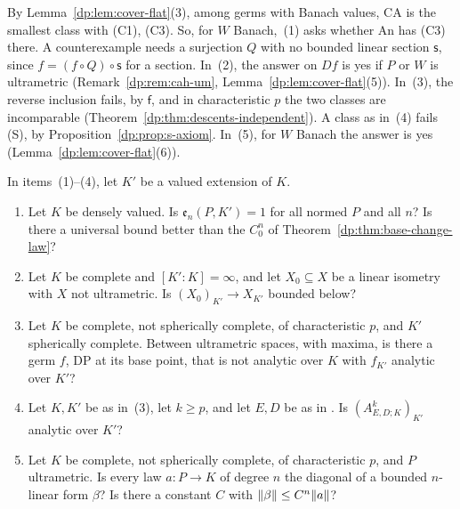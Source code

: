 By Lemma~\ref{dp:lem:cover-flat}(3), among germs with Banach values, CA is the smallest class with (C1), (C3). So, for $W$ Banach,~(1) asks whether An has (C3) there. A counterexample needs a surjection $Q$ with no bounded linear section $\mathsf s$, since $f=(f\circ Q)\circ\mathsf s$ for a section. In~(2), the answer on $Df$ is yes if $P$ or $W$ is ultrametric (Remark~\ref{dp:rem:cah-um}, Lemma~\ref{dp:lem:cover-flat}(5)). In~(3), the reverse inclusion fails, by $\mathsf f$, and in characteristic $p$ the two classes are incomparable (Theorem~\ref{dp:thm:descents-independent}). A class as in~(4) fails (S), by Proposition~\ref{dp:prop:s-axiom}. In~(5), for $W$ Banach the answer is yes (Lemma~\ref{dp:lem:cover-flat}(6)).

\begin{question}\label{dp:q:base-change}
In items~(1)--(4), let $K'$ be a valued extension of $K$.
\begin{enumerate}
\item Let $K$ be densely valued. Is $\mathfrak e_n(P,K')=1$ for all normed $P$ and all $n$? Is there a universal bound better than the $C_0^n$ of Theorem~\ref{dp:thm:base-change-law}?
\item Let $K$ be complete and $[K':K]=\infty$, and let $X_0\subseteq X$ be a linear isometry with $X$ not ultrametric. Is $(X_0)_{K'}\to X_{K'}$ bounded below?
\item Let $K$ be complete, not spherically complete, of characteristic $p$, and $K'$ spherically complete. Between ultrametric spaces, with maxima, is there a germ $f$, DP at its base point, that is not analytic over $K$ with $f_{K'}$ analytic over $K'$?
\item Let $K,K'$ be as in~\textup{(3)}, let $k\ge p$, and let $E,D$ be as in \cite[Theorem~7.2(2)]{I}. Is $(A^k_{E,D;K})_{K'}$ analytic over $K'$?
\item Let $K$ be complete, not spherically complete, of characteristic $p$, and $P$ ultrametric. Is every law $a\colon P\to K$ of degree $n$ the diagonal of a bounded $n$\nobreakdash-linear form $\beta$? Is there a constant $C$ with $\lVert \beta\rVert\le C^n\lVert a\rVert$?
\end{enumerate}
\end{question}

